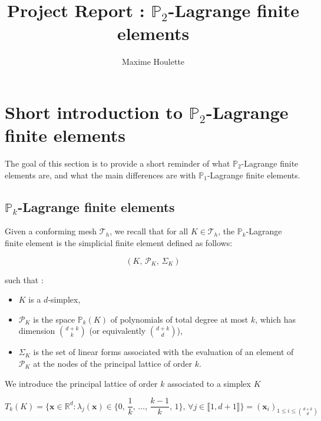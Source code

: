 \documentclass{article}
\title{\textbf{Project Report : $\mathbb{P}_2$-Lagrange finite elements}}
\author{Maxime Houlette}
\date{}
\theoremstyle{definition}
\theoremstyle{proposition}
\theoremstyle{theorem}
\theoremstyle{remark}
\theoremstyle{corollary}  %
\theoremstyle{exercise}
\theoremstyle{lemma}
\begin{document}
\maketitle
\vspace{3cm}

{\hypersetup{linkcolor=black}
\tableofcontents}

\newpage

\section{Short introduction to $\mathbb
P_2$-Lagrange finite elements}

The goal of this section is to provide a short reminder of what $\mathbb P_2$-Lagrange finite elements are, and what the main differences are with $\mathbb P_1$-Lagrange finite elements. \\

\subsection{$\mathbb P_k$-Lagrange finite elements}

Given a conforming mesh $\mathcal{T}_h$, we recall that for all $K \in \mathcal{T}_h$, the $\mathbb P_k$-Lagrange finite element is the simplicial finite element defined as follows:

$$(K, \, \mathcal{P}_K, \, \Sigma_K)$$

such that : 

\begin{itemize}
    \item[$\bullet$] $K$ is a $d$-simplex,
    \item[$\bullet$] $\mathcal{P}_K$ is the space $\mathbb{P}_k(K)$ of polynomials of total degree at most $k$, which has dimension $\binom{d+k}{k}$ (or equivalently $\binom{d+k}{d}$),
    \item[$\bullet$] $\Sigma_K$ is the set of linear forms associated with the evaluation of an element of $\mathcal{P}_K$ at the nodes of the principal lattice of order $k$.
\end{itemize}

We introduce the principal lattice of order $k$ associated to a simplex $K$

$$T_k(K) = \Big\{\bm x\in \mathbb{R}^d: \lambda_j(\bm x) \in \{0, \, \frac{1}{k}, \, \dots, \, \frac{k-1}{k}, \, 1\}, \, \forall j \in \llbracket 1, d+1\rrbracket\Big\} = (\bm x_i)_{1\leq i \leq \binom{d+k}{d}}$$
\end{document}

